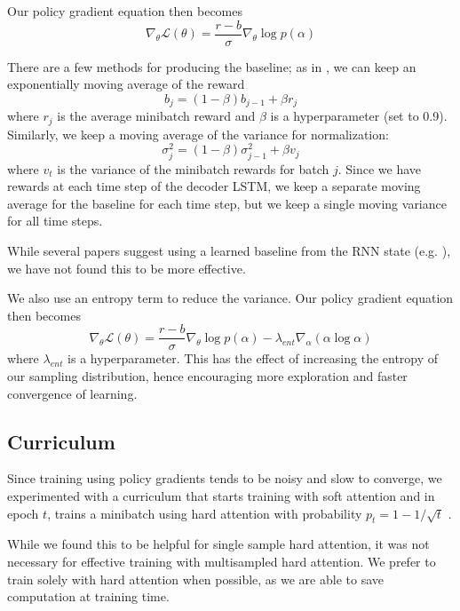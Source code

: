 \documentclass[11pt]{article}
\begin{document}
Our policy gradient equation then becomes
\begin{equation}
\label{policygradbaseline}
\nabla_\theta \mathcal{L}(\theta) = \frac{r-b}{\sigma} \nabla_\theta \log p(\alpha)
\end{equation}

There are a few methods for producing the baseline; as in \cite{mnih2014belief}, we can keep an exponentially moving average of the reward
$$b_j = (1 - \beta) b_{j-1} + \beta r_j$$
where $r_j$ is the average minibatch reward and $\beta$ is a hyperparameter (set to 0.9).
Similarly, we keep a moving average of the variance for normalization:
$$\sigma^2_j = (1 - \beta) \sigma^2_{j-1} + \beta v_j$$
where $v_t$ is the variance of the minibatch rewards for batch $j$. Since we have rewards at each time step of the decoder LSTM, we keep a separate moving average for the baseline for each time step, but we keep a single moving variance for all time steps.

While several papers suggest using a learned baseline from the RNN state (e.g. \cite{ranzato2015}), we have not found this to be more effective.

We also use an entropy term to reduce the variance. Our policy gradient equation then becomes
\begin{equation}
\label{policygradbaselineentropy}
\nabla_\theta \mathcal{L}(\theta) = \frac{r-b}{\sigma} \nabla_\theta \log p(\alpha) - \lambda_{ent} \nabla_\alpha(\alpha \log \alpha)
\end{equation}
where $\lambda_{ent}$ is a hyperparameter. This has the effect of increasing the entropy of our sampling distribution, hence encouraging more exploration and faster convergence of learning.

\subsection{Curriculum}

Since training using policy gradients tends to be noisy and slow to converge, we experimented with a curriculum that starts training with soft attention and in epoch $t$, trains a minibatch using hard attention with probability $p_t = 1 - 1/\sqrt{t}$ \citep{bengio2016hardntm}.

While we found this to be helpful for single sample hard attention, it was not necessary for effective training with multisampled hard attention. We prefer to train solely with hard attention when possible, as we are able to save computation at training time.
\end{document}
